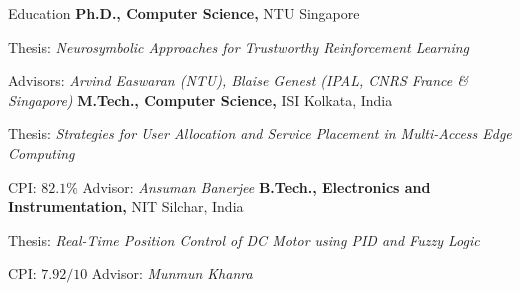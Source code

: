 \begin{rubric}{Education}
\entry*[2023 -- 2027]%
	\textbf{Ph.D., Computer Science,} NTU Singapore  
	\par Thesis: \emph{Neurosymbolic Approaches for Trustworthy Reinforcement Learning}  
    \par Advisors: \emph{Arvind Easwaran (NTU), Blaise Genest (IPAL, CNRS France \& Singapore)}  
%
\entry*[2019 -- 2021]%
	\textbf{M.Tech., Computer Science,} ISI Kolkata, India  
    \par Thesis: \emph{Strategies for User Allocation and Service Placement in Multi-Access Edge Computing}  
    \par CPI: $82.1\%$ \quad Advisor: \emph{Ansuman Banerjee}  
% 
\entry*[2012 -- 2016]%
	\textbf{B.Tech., Electronics and Instrumentation,} NIT Silchar, India  
    \par Thesis: \emph{Real-Time Position Control of DC Motor using PID and Fuzzy Logic}  
    \par CPI: $7.92/10$ \quad Advisor: \emph{Munmun Khanra}  
\end{rubric}
